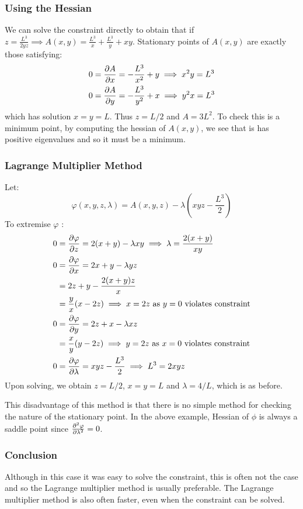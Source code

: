 \documentclass[../main.tex]{subfiles}
\begin{document}
\subsubsection{Using the Hessian}
We can solve the constraint directly to obtain that if $z = \frac{L^3}{2yz} \implies A(x, y) = \frac{L^3}{x} + \frac{L^3}{y} + xy$.
Stationary points of $A(x, y)$ are exactly those satisfying:
\begin{align*}
  0 &= \pderiv{A}{x} = - \frac{L^3}{x^2} + y \implies x^2 y = L^3 \\
  0 &= \pderiv{A}{y} = - \frac{L^3}{y^2} + x \implies y^2 x = L^3
\end{align*}
which has solution $x = y = L$.
Thus $z = L / 2$ and $A = 3L^2$.
To check this is a minimum point, by computing the hessian of $A(x, y)$, we see that is has positive eigenvalues and so it must be a minimum.
\subsubsection{Lagrange Multiplier Method}
Let:
\[
  \varphi(x, y, z, \lambda) = A(x, y, z) - \lambda\left(xyz - \frac{L^3}{2}\right)
\]
To extremise $\varphi$ :
\begin{align*}
  0 &= \pderiv{\varphi}{z} = 2(x + y) - \lambda xy \implies \lambda = \frac{2(x + y)}{xy} \\
  0 &= \pderiv{\varphi}{x} = 2x + y - \lambda yz \\
    &= 2z + y - \frac{2(x + y)z}{x} \\
    &= \frac{y}{x}(x - 2z) \implies x = 2z \text{ as $y = 0$ violates constraint} \\
  0 &= \pderiv{\varphi}{y} = 2z + x - \lambda xz \\
    &= \frac{x}{y}(y - 2z) \implies y = 2z \text{ as $x = 0$ violates constraint} \\
  0 &= \pderiv{\varphi}{\lambda} = xyz - \frac{L^3}{2} \implies L^3 = 2xyz
\end{align*}
Upon solving, we obtain $z = L/2$, $x = y = L$ and $\lambda = 4/L$, which is as before.

This disadvantage of this method is that there is no simple method for checking the nature of the stationary point.
In the above example, Hessian of $\phi$ is always a saddle point since $\pderiv[2]{\varphi}{\lambda} = 0$.
\subsubsection{Conclusion}
Although in this case it was easy to solve the constraint, this is often not the case and so the Lagrange multiplier method is usually preferable.
The Lagrange multiplier method is also often faster, even when the constraint can be solved.
\end{document}
